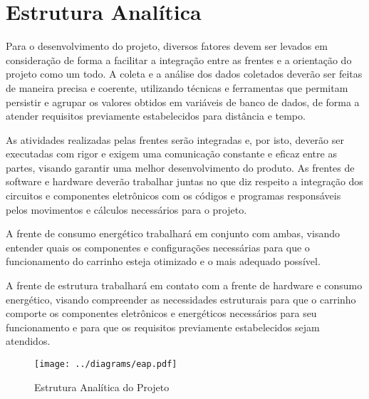 \section{Estrutura Analítica}

Para o desenvolvimento do projeto, diversos fatores devem ser levados em
consideração de forma a facilitar a integração entre as frentes e a orientação
do projeto como um todo. A coleta e a análise dos dados coletados deverão ser
feitas de maneira precisa e coerente, utilizando técnicas e ferramentas que
permitam persistir e agrupar os valores obtidos em variáveis de banco de dados,
de forma a atender requisitos previamente estabelecidos para distância e tempo.

As atividades realizadas pelas frentes serão integradas e, por isto, deverão ser
executadas com rigor e exigem uma comunicação constante e eficaz entre as
partes, visando garantir uma melhor desenvolvimento do produto. As frentes de
software e hardware deverão trabalhar juntas no que diz respeito a integração
dos circuitos e componentes eletrônicos com os códigos e programas responsáveis
pelos movimentos e cálculos necessários para o projeto.

A frente de consumo energético trabalhará em conjunto com ambas, visando
entender quais os componentes e configurações necessárias para que o
funcionamento do carrinho esteja otimizado e o mais adequado possível.

A frente de estrutura trabalhará em contato com a frente de hardware e consumo
energético, visando compreender as necessidades estruturais para que o carrinho
comporte os componentes eletrônicos e energéticos necessários para seu
funcionamento e para que os requisitos previamente estabelecidos sejam
atendidos.

\newpage

\begin{figure}[htb]
  \caption{\label{fig:eap} Estrutura Analítica do Projeto}

  \begin{center}
    \texttt{[image: ../diagrams/eap.pdf]}
  \end{center}

\end{figure}
